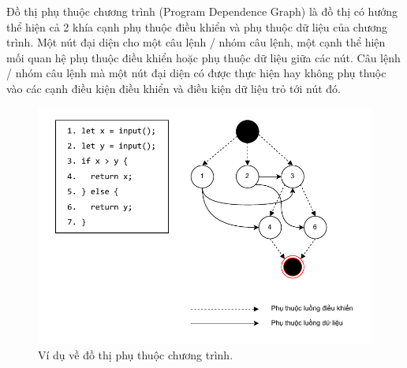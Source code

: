 

Đồ thị phụ thuộc chương trình (Program Dependence Graph) \cite{ferrante1987program, horwitz1992use} là đồ thị có hướng thể hiện cả 2 khía cạnh phụ thuộc điều khiển và phụ thuộc dữ liệu của chương trình.
Một nút đại diện cho một câu lệnh / nhóm câu lệnh, một cạnh thể hiện mối quan hệ phụ thuộc điều khiển hoặc phụ thuộc dữ liệu giữa các nút.
Câu lệnh / nhóm câu lệnh mà một nút đại diện có được thực hiện hay không phụ thuộc vào các cạnh điều kiện điều khiển và điều kiện dữ liệu trỏ tới nút đó.

\begin{figure}[H]
  \includegraphics[width=1\columnwidth]{figures/c2/c2_pdg.drawio.pdf}
  \centering
  \caption{Ví dụ về đồ thị phụ thuộc chương trình.}
  \label{img:c2_pdg}
\end{figure}


